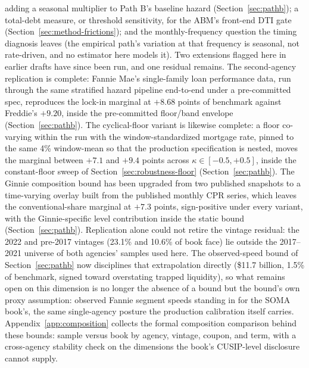 \documentclass[12pt]{article}
\begin{document}
adding a seasonal multiplier to Path B's baseline hazard (Section~\ref{sec:pathb}); a total-debt measure, or threshold sensitivity, for the ABM's front-end DTI gate (Section~\ref{sec:method-frictions}); and the monthly-frequency question the timing diagnosis leaves (the empirical path's variation at that frequency is seasonal, not rate-driven, and no estimator here models it). Two extensions flagged here in earlier drafts have since been run, and one residual remains. The second-agency replication is complete: Fannie Mae's single-family loan performance data, run through the same stratified hazard pipeline end-to-end under a pre-committed spec, reproduces the lock-in marginal at $+8.68$ points of benchmark against Freddie's $+9.20$, inside the pre-committed floor/band envelope (Section~\ref{sec:pathb}). The cyclical-floor variant is likewise complete: a floor co-varying within the run with the window-standardized mortgage rate, pinned to the same 4\% window-mean so that the production specification is nested, moves the marginal between $+7.1$ and $+9.4$ points across $\kappa \in [-0.5, +0.5]$, inside the constant-floor sweep of Section~\ref{sec:robustness-floor} (Section~\ref{sec:pathb}). The Ginnie composition bound has been upgraded from two published snapshots to a time-varying overlay built from the published monthly CPR series, which leaves the conventional-share marginal at $+7.3$ points, sign-positive under every variant, with the Ginnie-specific level contribution inside the static bound (Section~\ref{sec:pathb}). Replication alone could not retire the vintage residual: the 2022 and pre-2017 vintages (23.1\% and 10.6\% of book face) lie outside the 2017--2021 universe of both agencies' samples used here. The observed-speed bound of Section~\ref{sec:pathb} now disciplines that extrapolation directly (\$11.7 billion, 1.5\% of benchmark, signed toward overstating trapped liquidity), so what remains open on this dimension is no longer the absence of a bound but the bound's own proxy assumption: observed Fannie segment speeds standing in for the SOMA book's, the same single-agency posture the production calibration itself carries. Appendix~\ref{app:composition} collects the formal composition comparison behind these bounds: sample versus book by agency, vintage, coupon, and term, with a cross-agency stability check on the dimensions the book's CUSIP-level disclosure cannot supply.
\end{document}
